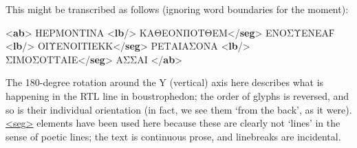This might be transcribed as follows (ignoring word boundaries for the moment): \par\bgroup{}\exampleFont \begin{shaded}\noindent\mbox{}{<\textbf{ab}>}\mbox{}\newline 
{}ΗΕΡΜΟΝΤΙΝA\mbox{}\newline 
{<\textbf{lb}/>}\mbox{}\newline 
{}ΚΑΘΕΟΝΠΟΤΘΕΜ{</\textbf{seg}>}\mbox{}\newline 
{}ΕΝΟΣΥΕΝΕΑϜ\mbox{}\newline 
{<\textbf{lb}/>}\mbox{}\newline 
{}ΟΙΥΕΝΟΙΤΙΕΚΚ{</\textbf{seg}>}\mbox{}\newline 
{}ΡΕΤΑΙΑΣΟΝΑ\mbox{}\newline 
{<\textbf{lb}/>}\mbox{}\newline 
{}ΣΙΜΟΣΟΤΤΑΙΕ{</\textbf{seg}>}\mbox{}\newline 
{}ΑΣΣΑΙ\mbox{}\newline 
\mbox{}\newline 
{</\textbf{ab}>}\end{shaded}\egroup\par \par
The 180-degree rotation around the Y (vertical) axis here describes what is happening in the RTL line in boustrophedon; the order of glyphs is reversed, and so is their individual orientation (in fact, we see them ‘from the back’, as it were). \hyperref[TEI.seg]{<seg>} elements have been used here because these are clearly not ‘lines’ in the sense of poetic lines; the text is continuous prose, and linebreaks are incidental.\par
